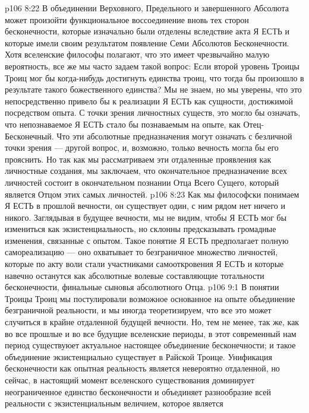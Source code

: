 \vs p106 8:22 В объединении Верховного, Предельного и завершенного Абсолюта может произойти функциональное воссоединение вновь тех сторон бесконечности, которые изначально были отделены вследствие акта Я ЕСТЬ и которые имели своим результатом появление Семи Абсолютов Бесконечности. Хотя вселенские философы полагают, что это имеет чрезвычайно малую вероятность, все же мы часто задаем такой вопрос: Если второй уровень Троицы Троиц мог бы когда\hyp{}нибудь достигнуть единства троиц, что тогда бы произошло в результате такого божественного единства? Мы не знаем, но мы уверены, что это непосредственно привело бы к реализации Я ЕСТЬ как сущности, достижимой посредством опыта. С точки зрения личностных существ, это могло бы означать, что непознаваемое Я ЕСТЬ стало бы познаваемым на опыте, как Отец\hyp{}Бесконечный. Что эти абсолютные предназначения могут означать с безличной точки зрения --- другой вопрос, и, возможно, только вечность могла бы его прояснить. Но так как мы рассматриваем эти отдаленные проявления как личностные создания, мы заключаем, что окончательное предназначение всех личностей состоит в окончательном познании Отца Всего Сущего, который является Отцом этих самых личностей.
\vs p106 8:23 Как мы философски понимаем Я ЕСТЬ в прошлой вечности, он существует один, с ним рядом нет ничего и никого. Заглядывая в будущее вечности, мы не видим, чтобы Я ЕСТЬ мог бы измениться как экзистенциальность, но склонны предсказывать громадные изменения, связанные с опытом. Такое понятие Я ЕСТЬ предполагает полную самореализацию --- оно охватывает то безграничное множество личностей, которые по акту воли стали участниками самооткровения Я ЕСТЬ и которые навечно останутся как абсолютные волевые составляющие тотальности бесконечности, финальные сыновья абсолютного Отца.
\vs p106 9:1 В понятии Троицы Троиц мы постулировали возможное основанное на опыте объединение безграничной реальности, и мы иногда теоретизируем, что все это может случиться в крайне отдаленной будущей вечности. Но, тем не менее, так же, как во все прошлые и во все будущие вселенские периоды, в этот современный нам период существуюет актуальное настоящее объединение бесконечности; и такое объединение экзистенциально существует в Райской Троице. Унификация бесконечности как опытная реальность является невероятно отдаленной, но сейчас, в настоящий момент вселенского существования доминирует неограниченное единство бесконечности и объединяет разнообразие всей реальности с экзистенциальным величием, которое является 
